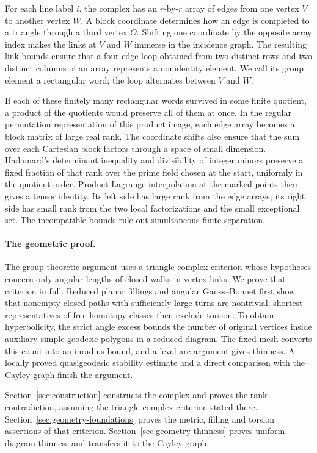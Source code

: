 \documentclass[11pt]{article}
\theoremstyle{remark}
\numberwithin{equation}{section}
\begin{document}
For each line label $i$, the complex has an $r$-by-$r$ array of edges from one vertex $V$ to another vertex $W$. A block coordinate determines how an edge is completed to a triangle through a third vertex $O$. Shifting one coordinate by the opposite array index makes the links at $V$ and $W$ immerse in the incidence graph. The resulting link bounds ensure that a four-edge loop obtained from two distinct rows and two distinct columns of an array represents a nonidentity element. We call its group element a rectangular word; the loop alternates between $V$ and $W$.

If each of these finitely many rectangular words survived in some finite quotient, a product of the quotients would preserve all of them at once. In the regular permutation representation of this product image, each edge array becomes a block matrix of large real rank. The coordinate shifts also ensure that the sum over each Cartesian block factors through a space of small dimension. Hadamard's determinant inequality and divisibility of integer minors preserve a fixed fraction of that rank over the prime field chosen at the start, uniformly in the quotient order. Product Lagrange interpolation at the marked points then gives a tensor identity. Its left side has large rank from the edge arrays; its right side has small rank from the two local factorizations and the small exceptional set. The incompatible bounds rule out simultaneous finite separation.

\paragraph{The geometric proof.}
The group-theoretic argument uses a triangle-complex criterion whose hypotheses concern only angular lengths of closed walks in vertex links. We prove that criterion in full. Reduced planar fillings and angular Gauss--Bonnet first show that nonempty closed paths with sufficiently large turns are nontrivial; shortest representatives of free homotopy classes then exclude torsion. To obtain hyperbolicity, the strict angle excess bounds the number of original vertices inside auxiliary simple geodesic polygons in a reduced diagram. The fixed mesh converts this count into an inradius bound, and a level-arc argument gives thinness. A locally proved quasigeodesic stability estimate and a direct comparison with the Cayley graph finish the argument.

Section~\ref{sec:construction} constructs the complex and proves the rank contradiction, assuming the triangle-complex criterion stated there. Section~\ref{sec:geometry-foundations} proves the metric, filling and torsion assertions of that criterion. Section~\ref{sec:geometry-thinness} proves uniform diagram thinness and transfers it to the Cayley graph.







\end{document}
